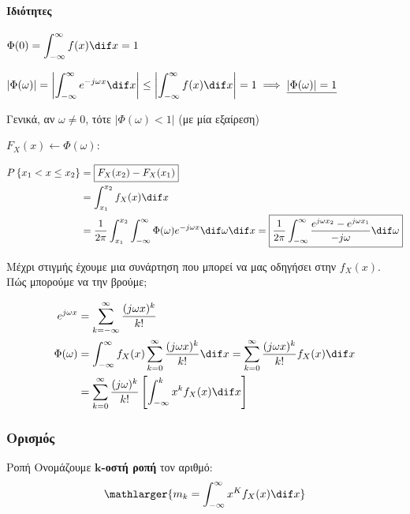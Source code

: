 \documentclass[11pt,a4paper,notitlepage,fleqn,final]{article}
\begin{document}
\paragraph{Ιδιότητες}
\begin{enumpar}
	\item \( \displaystyle \Phi(0)
	= \int_{-\infty}^{\infty} f(x)\dif x = 1 \)
	\item \( \displaystyle \left| \Phi(\omega ) \right| = \left|
	\int_{-\infty}^{\infty} e^{-j\omega x}\dif x
	\right| 
	\leq \left|\int_{-\infty}^{\infty} f(x)\dif x\right| = 1
	\implies \underline{\left|\Phi(\omega )\right|=1}
	\)
	
	Γενικά, αν \( \omega \neq 0 \), τότε \( \left|
	\Phi(\omega ) < 1
	\right| \) (με μία εξαίρεση)
	\item \( F_X(x) \leftarrow \Phi(\omega ) \):
	
	\begin{align*}
		P\left\lbrace x_1 < x \leq x_2 \right\rbrace
		&= \boxed{F_X(x_2) - F_X(x_1)}
		\\ &= \int_{x_1}^{x_2} f_X(x)\dif x
		\\ &= \frac{1}{2\pi} \int_{x_1}^{x_2}
		\int_{-\infty}^{\infty} \Phi(\omega )e^{-j\omega x}
		\dif \omega \dif x = \boxed{
			\frac{1}{2\pi} \int_{-\infty}^{\infty}
			\frac{e^{j\omega x_2}-e^{j\omega x_1}}{-j\omega }
			\dif \omega 
			}
	\end{align*}
\end{enumpar}

Μέχρι στιγμής έχουμε μια συνάρτηση που μπορεί να μας οδηγήσει στην
\( f_X(x) \). Πώς μπορούμε να την βρούμε;

\begin{align*}
	e^{j\omega x} &= \sum_{k=-\infty}^{\infty}
	\frac{(j\omega x)^k}{k!} \\
	\Phi(\omega ) &= \int_{-\infty}^{\infty} f_X(x)
	\sum_{k=0}^{\infty} \frac{(j\omega x)^k}{k!}\dif x
	= \sum_{k=0}^{\infty} \frac{(j\omega x)^k}{k!}
	f_X(x)\dif x
	\\ &= \sum_{k=0}^{\infty} \frac{(j\omega )^k}{k!}
	\left[
	\int_{-\infty}^{k} x^k f_X(x)\dif x
	\right]
\end{align*}


\subsubsection{Ορισμός}
\begin{defn}{Ροπή}{}
	Ονομάζουμε \( \mathbf{k} \)\textbf{-οστή ροπή} τον αριθμό:
	\[
	\mathlarger{m_k
	= \int_{-\infty}^{\infty} x^K f_X(x)\dif x
	}
	\]
\end{defn}
\end{document}
